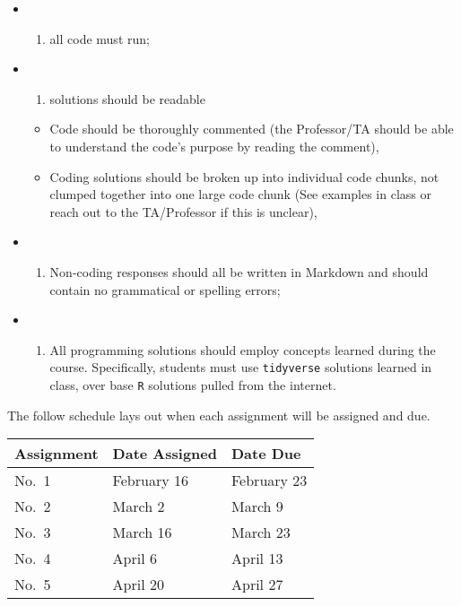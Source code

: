 \documentclass[
  12pt,
]{article}
\providecommand{\tightlist}{%
  \setlength{\itemsep}{0pt}\setlength{\parskip}{0pt}}
\begin{document}
\begin{itemize}
\item
  \begin{enumerate}
  \def\labelenumi{(\roman{enumi})}
  \tightlist
  \item
    all code must run;
  \end{enumerate}
\item
  \begin{enumerate}
  \def\labelenumi{(\roman{enumi})}
  \setcounter{enumi}{1}
  \tightlist
  \item
    solutions should be readable
  \end{enumerate}

  \begin{itemize}
  \tightlist
  \item
    Code should be thoroughly commented (the Professor/TA should be able
    to understand the code's purpose by reading the comment),
  \item
    Coding solutions should be broken up into individual code chunks,
    not clumped together into one large code chunk (See examples in
    class or reach out to the TA/Professor if this is unclear),
  \end{itemize}
\item
  \begin{enumerate}
  \def\labelenumi{(\roman{enumi})}
  \setcounter{enumi}{2}
  \tightlist
  \item
    Non-coding responses should all be written in Markdown and should
    contain no grammatical or spelling errors;
  \end{enumerate}
\item
  \begin{enumerate}
  \def\labelenumi{(\roman{enumi})}
  \setcounter{enumi}{3}
  \tightlist
  \item
    All programming solutions should employ concepts learned during the
    course. Specifically, students must use \texttt{tidyverse} solutions
    learned in class, over base \texttt{R} solutions pulled from the
    internet.
  \end{enumerate}
\end{itemize}

The follow schedule lays out when each assignment will be assigned and
due.

\begin{longtable}[]{@{}lll@{}}
\toprule
Assignment & Date Assigned & Date Due\tabularnewline
\midrule
\endhead
No.~1 & February 16 & February 23\tabularnewline
No.~2 & March 2 & March 9\tabularnewline
No.~3 & March 16 & March 23\tabularnewline
No.~4 & April 6 & April 13\tabularnewline
No.~5 & April 20 & April 27\tabularnewline
\bottomrule
\end{longtable}
\end{document}
